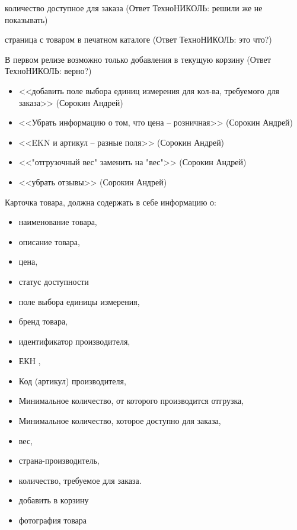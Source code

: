 {\begin{hybris}
количество доступное для заказа (Ответ ТехноНИКОЛЬ: решили же не показывать)

страница с товаром в печатном каталоге (Ответ ТехноНИКОЛЬ: это что?)

В первом релизе возможно только добавления в текущую корзину (Ответ ТехноНИКОЛЬ: верно?)
\end{hybris}

\begin{tn}
\begin{itemize}
\item <<добавить поле выбора единиц измерения для кол-ва, требуемого для заказа>> (Сорокин Андрей)
\item <<Убрать информацию о том, что цена -- розничная>> (Сорокин Андрей)
\item <<EKN и артикул -- разные поля>> (Сорокин Андрей)
\item <<"отгрузочный вес" заменить на "вес">> (Сорокин Андрей)
\item <<убрать отзывы>> (Сорокин Андрей)
\end{itemize}
\end{tn}


\begin{itogo}
Карточка товара, должна содержать в себе информацию о: 
\begin{itemize}
\item наименование товара,
\item описание товара,
\item цена,
\item статус доступности
\item поле выбора единицы измерения,
\item бренд товара,
\item идентификатор производителя,
\item ЕКН ,
\item Код (артикул) производителя,
\item Минимальное количество, от которого производится отгрузка,
\item Минимальное количество, которое доступно для заказа,
\item вес,
\item страна-производитель,
\item количество, требуемое для заказа.
\item добавить в корзину
\item фотография товара
\end{itemize}
\end{itogo}




}



